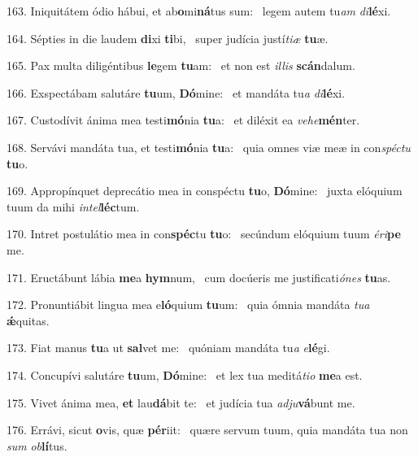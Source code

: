 163. Iniquitátem ódio hábui, et ab\textbf{o}mi\textbf{ná}tus sum: \ast\  legem autem tu\textit{am} \textit{di}\textbf{lé}xi.\

164. Sépties in die laudem \textbf{di}xi \textbf{ti}bi, \ast\  super judícia justí\textit{ti}\textit{æ} \textbf{tu}æ.\

165. Pax multa diligéntibus \textbf{le}gem \textbf{tu}am: \ast\  et non est \textit{il}\textit{lis} \textbf{scán}dalum.\

166. Exspectábam salutáre \textbf{tu}um, \textbf{Dó}mine: \ast\  et mandáta tu\textit{a} \textit{di}\textbf{lé}xi.\

167. Custodívit ánima mea testi\textbf{mó}nia \textbf{tu}a: \ast\  et diléxit ea \textit{ve}\textit{he}\textbf{mén}ter.\

168. Servávi mandáta tua, et testi\textbf{mó}nia \textbf{tu}a: \ast\  quia omnes viæ meæ in con\textit{spéc}\textit{tu} \textbf{tu}o.\

169. Appropínquet deprecátio mea in conspéctu \textbf{tu}o, \textbf{Dó}mine: \ast\  juxta elóquium tuum da mihi \textit{in}\textit{tel}\textbf{léc}tum.\

170. Intret postulátio mea in con\textbf{spéc}tu \textbf{tu}o: \ast\  secúndum elóquium tuum \textit{é}\textit{ri}\textbf{pe} me.\

171. Eructábunt lábia \textbf{me}a \textbf{hym}num, \ast\  cum docúeris me justificati\textit{ó}\textit{nes} \textbf{tu}as.\

172. Pronuntiábit lingua mea e\textbf{ló}quium \textbf{tu}um: \ast\  quia ómnia mandáta \textit{tu}\textit{a} \textbf{ǽ}quitas.\

173. Fiat manus \textbf{tu}a ut \textbf{sal}vet me: \ast\  quóniam mandáta tu\textit{a} \textit{e}\textbf{lé}gi.\

174. Concupívi salutáre \textbf{tu}um, \textbf{Dó}mine: \ast\  et lex tua meditá\textit{ti}\textit{o} \textbf{me}a est.\

175. Vivet ánima mea, \textbf{et} lau\textbf{dá}bit te: \ast\  et judícia tua \textit{ad}\textit{ju}\textbf{vá}bunt me.\

176. Errávi, sicut \textbf{o}vis, quæ \textbf{pér}iit: \ast\  quære servum tuum, quia mandáta tua non \textit{sum} \textit{ob}\textbf{lí}tus.\


